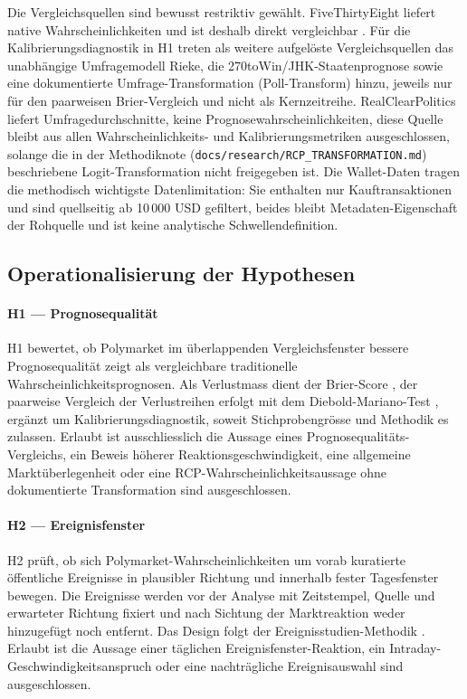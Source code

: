 Die Vergleichsquellen sind bewusst restriktiv gewählt. FiveThirtyEight liefert
native Wahrscheinlichkeiten und ist deshalb direkt vergleichbar
\citep{zotero_poly_002}. Für die Kalibrierungsdiagnostik in H1 treten als weitere aufgelöste Vergleichsquellen das unabhängige Umfragemodell Rieke, die 270toWin/JHK-Staatenprognose sowie eine dokumentierte Umfrage-Transformation (Poll-Transform) hinzu, jeweils nur für den paarweisen Brier-Vergleich und nicht als Kernzeitreihe. RealClearPolitics liefert Umfragedurchschnitte, keine
Prognosewahrscheinlichkeiten, diese Quelle bleibt aus allen Wahrscheinlichkeits-
und Kalibrierungsmetriken ausgeschlossen, solange die in der Methodiknote
(\texttt{docs/research/RCP\_TRANSFORMATION.md}) beschriebene Logit-Transformation
nicht freigegeben ist. Die Wallet-Daten tragen die methodisch wichtigste
Datenlimitation: Sie enthalten nur Kauftransaktionen und sind quellseitig ab
10\,000 USD gefiltert, beides bleibt Metadaten-Eigenschaft der Rohquelle und ist
keine analytische Schwellendefinition.

\subsection{Operationalisierung der Hypothesen}

\paragraph{H1 --- Prognosequalität}
H1 bewertet, ob Polymarket im überlappenden Vergleichsfenster bessere
Prognosequalität zeigt als vergleichbare traditionelle
Wahrscheinlichkeitsprognosen. Als Verlustmass dient der Brier-Score
\citep{lit_brier_001}, der paarweise Vergleich der Verlustreihen erfolgt mit dem
Diebold-Mariano-Test \citep{lit_dm_001}, ergänzt um Kalibrierungsdiagnostik,
soweit Stichprobengrösse und Methodik es zulassen. Erlaubt ist ausschliesslich
die Aussage eines Prognosequalitäts-Vergleichs, ein Beweis höherer
Reaktionsgeschwindigkeit, eine allgemeine Marktüberlegenheit oder eine
RCP-Wahrscheinlichkeitsaussage ohne dokumentierte Transformation sind
ausgeschlossen.

\paragraph{H2 --- Ereignisfenster}
H2 prüft, ob sich Polymarket-Wahrscheinlichkeiten um vorab kuratierte
öffentliche Ereignisse in plausibler Richtung und innerhalb fester Tagesfenster
bewegen. Die Ereignisse werden vor der Analyse mit Zeitstempel, Quelle und
erwarteter Richtung fixiert und nach Sichtung der Marktreaktion weder
hinzugefügt noch entfernt. Das Design folgt der Ereignisstudien-Methodik
\citep{lit_eventstudy_001}. Erlaubt ist die Aussage einer täglichen
Ereignisfenster-Reaktion, ein Intraday-Geschwindigkeitsanspruch oder eine
nachträgliche Ereignisauswahl sind ausgeschlossen.

